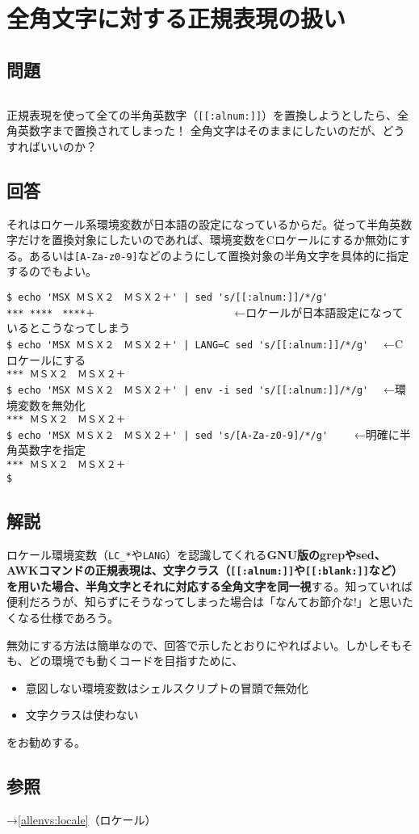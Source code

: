 \section{全角文字に対する正規表現の扱い}
\label{recipe:zenkaku_regexp}

\subsection*{問題}
\noindent
$\!\!\!\!\!$
\begin{grshfboxit}{160.0mm}
	正規表現を使って全ての半角英数字（\verb|[[:alnum:]]|）を置換しようとしたら、全角英数字まで置換されてしまった！
	全角文字はそのままにしたいのだが、どうすればいいのか？
\end{grshfboxit}

\subsection*{回答}
それはロケール系環境変数が日本語の設定になっているからだ。従って半角英数字だけを置換対象にしたいのであれば、環境変数をCロケールにするか無効にする。あるいは\verb|[A-Za-z0-9]|などのようにして置換対象の半角文字を具体的に指定するのでもよい。
\begin{screen}
	\verb!$ echo 'MSX ＭＳＸ２　ＭＳＸ２＋' | sed 's/[[:alnum:]]/*/g'! \return \\
	\verb!*** ****　****＋! 　　　　　　　　　　　　←ロケールが日本語設定になっているとこうなってしまう \\
	\verb!$ echo 'MSX ＭＳＸ２　ＭＳＸ２＋' | LANG=C sed 's/[[:alnum:]]/*/g'! \return 　←Cロケールにする \\
	\verb!*** ＭＳＸ２　ＭＳＸ２＋! \\
	\verb!$ echo 'MSX ＭＳＸ２　ＭＳＸ２＋' | env -i sed 's/[[:alnum:]]/*/g'! \return 　←環境変数を無効化 \\
	\verb!*** ＭＳＸ２　ＭＳＸ２＋! \\
	\verb!$ echo 'MSX ＭＳＸ２　ＭＳＸ２＋' | sed 's/[A-Za-z0-9]/*/g'! \return 　　←明確に半角英数字を指定 \\
	\verb!*** ＭＳＸ２　ＭＳＸ２＋! \\
	\verb!$ !
\end{screen}

\subsection*{解説}

ロケール環境変数（\verb|LC_*|や\verb|LANG|）を認識してくれる\textbf{GNU版のgrepやsed、AWKコマンドの正規表現は、文字クラス（\verb|[[:alnum:]]|や\verb|[[:blank:]]|など）を用いた場合、半角文字とそれに対応する全角文字を同一視}する。知っていれば便利だろうが、知らずにそうなってしまった場合は「なんてお節介な!」と思いたくなる仕様であろう。

無効にする方法は簡単なので、回答で示したとおりにやればよい。しかしそもそも、どの環境でも動くコードを目指すために、
\begin{itemize}
  \item 意図しない環境変数はシェルスクリプトの冒頭で無効化
  \item 文字クラスは使わない
\end{itemize}
をお勧めする。

\subsection*{参照}

\noindent
→\ref{allenvs:locale}（ロケール）
